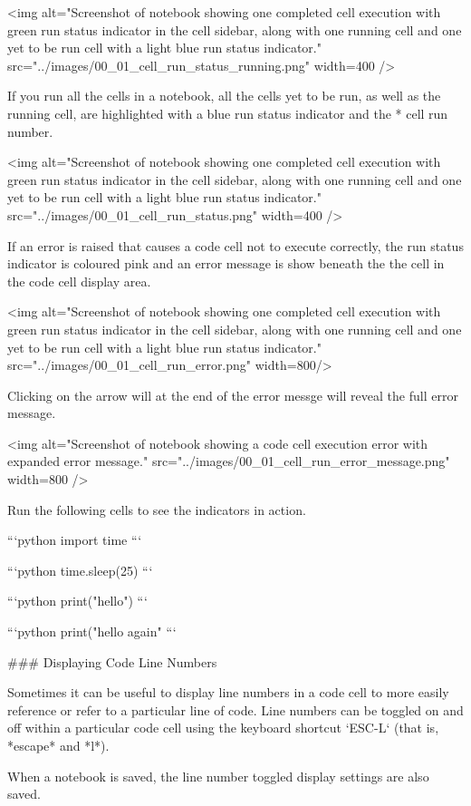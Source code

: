 \documentclass[letterpaper,10pt,english]{sphinxmanual}
\begin{document}
<img alt="Screenshot of notebook showing one completed cell execution with green run status indicator in the cell sidebar, along with one running cell and one yet to be run cell with a light blue run status indicator." src="../images/00_01_cell_run_status_running.png" width=400 />

If you run all the cells in a notebook, all the cells yet to be run, as well as the running cell, are highlighted with a blue run status indicator and the * cell run number.

<img alt="Screenshot of notebook showing one completed cell execution with green run status indicator in the cell sidebar, along with one running cell and one yet to be run cell with a light blue run status indicator." src="../images/00_01_cell_run_status.png" width=400 />


If an error is raised that causes a code cell not to execute correctly, the run status indicator is coloured pink and an error message is show beneath the the cell in the code cell display area.

<img alt="Screenshot of notebook showing one completed cell execution with green run status indicator in the cell sidebar, along with one running cell and one yet to be run cell with a light blue run status indicator." src="../images/00_01_cell_run_error.png" width=800/>

Clicking on the arrow will at the end of the error messge will reveal the full error message.

<img alt="Screenshot of notebook showing a code cell execution error with expanded error message." src="../images/00_01_cell_run_error_message.png" width=800 />


Run the following cells to see the indicators in action.

```python
import time
```

```python
time.sleep(25)
```

```python
print("hello")
```

```python
print("hello again"
```

### Displaying Code Line Numbers

Sometimes it can be useful to display line numbers in a code cell to more easily reference or refer to a particular line of code. Line numbers can be toggled on and off within a particular code cell using the keyboard shortcut `ESC-L` (that is, *escape* and *l*).

When a notebook is saved, the  line number toggled display settings are also saved.
\end{document}
